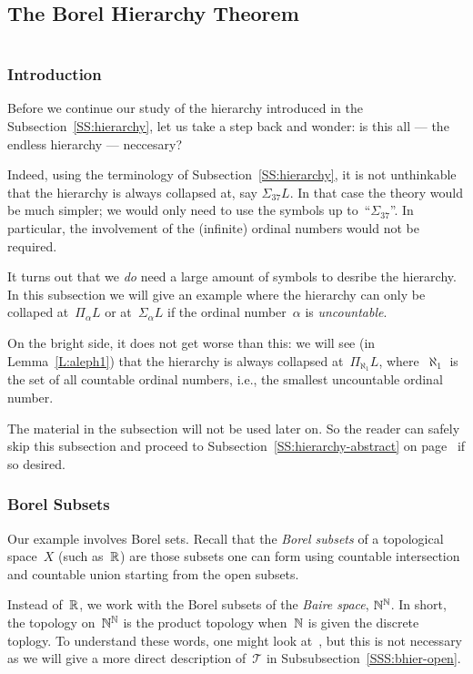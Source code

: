 \documentclass[main.tex]{subfiles}
\begin{document}
%
%
\subsection{The Borel Hierarchy Theorem}$\,$\\
\subsubsection{Introduction}$\,$\\
Before we continue our study of the hierarchy introduced in the
Subsection~\ref{SS:hierarchy}, let us take a step back and wonder: 
 is this all --- the endless hierarchy --- neccesary?

Indeed,
using the terminology of Subsection~\ref{SS:hierarchy},
it is not unthinkable
that the hierarchy is always collapsed
at, say $\Sigma_{37} L$.
In that case 
the theory would be much simpler;
we would only need to
use the symbols up to~``$\Sigma_{37}$''.
In particular,
the involvement of the (infinite) ordinal numbers would not be required.

It turns out that we \emph{do} need a large amount of symbols
to desribe the hierarchy.
In this subsection we will give an example
where the hierarchy can only be collaped at~$\Pi_\alpha L$
or at~$\Sigma_\alpha L$
if the ordinal number~$\alpha$ is \emph{uncountable}.

On the bright side,
it does not get worse than this:
we will see 
(in Lemma~\ref{L:aleph1})
that 
the hierarchy is always collapsed at~$\Pi_{\aleph_1} L$,
where~$\aleph_1$
is the set of all countable ordinal numbers,
i.e., the smallest uncountable ordinal number.

The material in the subsection will not be used later on.
So the reader can safely skip this subsection
and proceed to Subsection~\ref{SS:hierarchy-abstract} 
on page~\pageref{SS:hierarchy-abstract}
if so desired.

\subsubsection{Borel Subsets}$\,$\\
Our example involves Borel sets.
Recall that the \emph{Borel subsets}
of a topological space~$X$
(such as~$\mathbb{R}$)
are those subsets one can form using countable intersection
and countable union starting from the open subsets.

Instead of~$\mathbb{R}$,
we  work with the Borel subsets
of the 
 \emph{Baire space},
 $\mathbb{N}^{\mathbb{N}}$.
In short,
the topology on~$\mathbb{N}^{\mathbb{N}}$
is the product topology
when~$\mathbb{N}$ is given the discrete toplogy.
To understand these words,
one might look at~\cite{Willard70},
but this is not necessary as we will
give a more direct description of~$\mathcal{T}$
in Subsubsection~\ref{SSS:bhier-open}.
\end{document}
